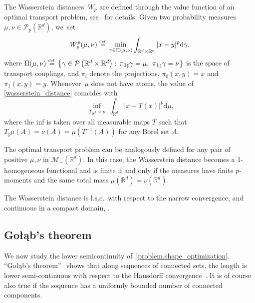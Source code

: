 \documentclass[JEP,XML,SOM,Unicode,NoFloatCountersInSection,published]{cedram}
\theoremstyle{definition}
\newcommand{\eqdef}{\ensuremath{\stackrel{\mbox{\upshape\tiny def.}}{=}}}
\newcommand{\RR}{\mathbb{R}}
\newcommand\dd{\mathrm{d}}
\begin{document}
The Wasserstein distan\-ces~$W_p$ are defined through the value function of an optimal transport problem, see~\cite{ambrosio2008gradient,santambrogio2015optimal,villani2009optimal} for details. Given two probability measures $\mu, \nu \in \mathcal{P}_p(\RR^d)$, we~set
\begin{equation}\label{wasserstein_distance}
W_p^p(\mu, \nu)
\eqdef
\min_{\gamma \in \Pi(\mu, \nu)}
\int_{\RR^d\times \RR^d} |x - y|^p\dd\gamma,
\end{equation}
where
$\Pi(\mu, \nu) \eqdef
\left\{
\gamma \in \mathcal{P}\left(\RR^d\times \RR^d\right) :
\,
{\pi_{0}}_\sharp\gamma = \mu, \
{\pi_{1}}_\sharp\gamma = \nu
\right\}
$
is the space of transport couplings, and $\pi_i$ denote the projections, \ie $\pi_0(x,y) = x$ and $\pi_1(x,y) = y$. Whenever~$\mu$ does not have atoms, the value of \eqref{wasserstein_distance} coincides with
\begin{equation}\label{wasserstein_distance.monge}
\inf_{
\substack{
T_{\sharp}\mu = \nu
}
}
\int_{\RR^d} |x - T(x)|^p\dd \mu,
\end{equation}
where the inf is taken over all measurable maps $T$ such that $T_\sharp\mu(A) = \nu(A) = \mu(T^{-1}(A))$ for any Borel set $A$.

The optimal transport problem can be analogously defined for any pair of positive $\mu, \nu$ in $\mathcal{M}_+(\RR^d)$. In this case, the Wasserstein distance becomes a 1-homogeneous functional and is finite if and only if the measures have finite $p$-moments and the same total mass $\mu(\RR^d) = \nu(\RR^d)$.

The Wasserstein distance is l.s.c.~with respect to the narrow convergence, and continuous in a compact domain, \cite[Lem.\,4.3]{villani2009optimal}.

\newcommand{\Golab}{Go\l\k{a}b}
\subsection{\Golab's theorem}
We now study the lower semicontinuity of~\eqref{problem.shape_optimization}.
``\Golab's theorem''~\cite{Golab} shows that along sequences of connected sets, the length is lower semi-continuous with respect to the Hausdorff convergence~\cite[Chap.\,10]{morel2012variational}.
It is of course also true if the sequence has a uniformly bounded number of connected components.
\end{document}
